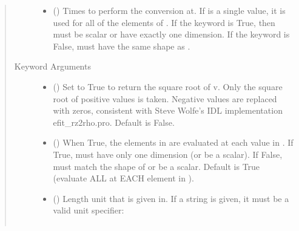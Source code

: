 \documentclass[letterpaper,10pt,english]{sphinxmanual}
\begin{document}
\begin{fulllineitems}
\begin{fulllineitems}
\begin{quote}
\begin{description}
\begin{itemize}
\item {} 
 () \textendash{} Times to perform the conversion at.
If  is a single value, it is used for all of the elements of
. If the  keyword is True, then  must be scalar
or have exactly one dimension. If the  keyword is False,
 must have the same shape as .

\end{itemize}

\item[{Keyword Arguments}] \leavevmode\begin{itemize}
\item {} 
 () \textendash{} Set to True to return the square root of v.
Only the square root of positive values is taken. Negative
values are replaced with zeros, consistent with Steve Wolfe’s
IDL implementation efit\_rz2rho.pro. Default is False.

\item {} 
 () \textendash{} When True, the elements in  are evaluated
at each value in . If True,  must have only one dimension
(or be a scalar). If False,  must match the shape of 
or be a scalar. Default is True (evaluate ALL  at EACH
element in ).

\item {} 
 () \textendash{} 
Length unit that  is given in.
If a string is given, it must be a valid unit specifier:
\begin{quote}


\begin{savenotes}\sphinxattablestart
\centering
\begin{tabulary}{\linewidth}[t]{|T|T|}
\hline


\end{tabulary}
\end{savenotes}
\end{quote}
\end{itemize}
\end{description}
\end{quote}
\end{fulllineitems}
\end{fulllineitems}
\end{document}
